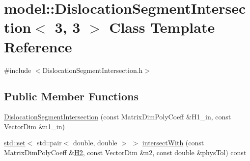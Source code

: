 \hypertarget{classmodel_1_1_dislocation_segment_intersection_3_013_00_013_01_4}{}\section{model\+:\+:Dislocation\+Segment\+Intersection$<$ 3, 3 $>$ Class Template Reference}
\label{classmodel_1_1_dislocation_segment_intersection_3_013_00_013_01_4}


{\ttfamily \#include $<$Dislocation\+Segment\+Intersection.\+h$>$}

\subsection*{Public Member Functions}
\begin{DoxyCompactItemize}
\item 
\hyperlink{classmodel_1_1_dislocation_segment_intersection_3_013_00_013_01_4_a9ec38b6df455755aab60a56c5691ffca}{Dislocation\+Segment\+Intersection} (const Matrix\+Dim\+Poly\+Coeff \&H1\+\_\+in, const Vector\+Dim \&n1\+\_\+in)
\item 
\hyperlink{plot_cells_8m_a03623d69001c34fc77654be29bdc3d8a}{std\+::set}$<$ std\+::pair$<$ double, double $>$ $>$ \hyperlink{classmodel_1_1_dislocation_segment_intersection_3_013_00_013_01_4_a9feca7617455bc314b1df1150f2f34bd}{intersect\+With} (const Matrix\+Dim\+Poly\+Coeff \&\hyperlink{plot_network_8m_ab6553dbc99719803cd55247cf5df96d4}{H2}, const Vector\+Dim \&n2, const double \&phys\+Tol) const 
\end{DoxyCompactItemize}
